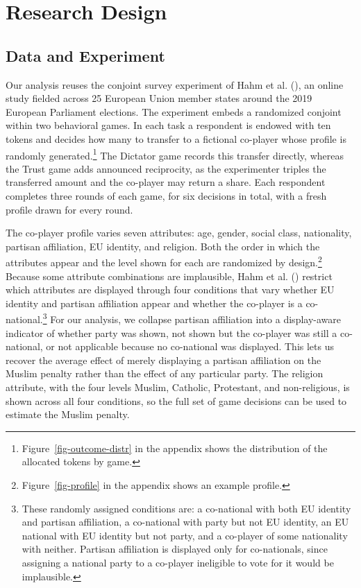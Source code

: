 \documentclass[
  10pt,
  a4paper,
  DIV=11,
  numbers=noendperiod]{scrartcl}
\begin{document}
\section{Research Design}\label{sec-design}

\subsection{Data and Experiment}\label{data-and-experiment}

Our analysis reuses the conjoint survey experiment of Hahm et al.
(), an online study fielded across
25 European Union member states around the 2019 European Parliament
elections. The experiment embeds a randomized conjoint within two
behavioral games. In each task a respondent is endowed with ten tokens
and decides how many to transfer to a fictional co-player whose profile
is randomly generated.\footnote{Figure~\ref{fig-outcome-distr} in the
  appendix shows the distribution of the allocated tokens by game.} The
Dictator game records this transfer directly, whereas the Trust game
adds announced reciprocity, as the experimenter triples the transferred
amount and the co-player may return a share. Each respondent completes
three rounds of each game, for six decisions in total, with a fresh
profile drawn for every round.

The co-player profile varies seven attributes: age, gender, social
class, nationality, partisan affiliation, EU identity, and religion.
Both the order in which the attributes appear and the level shown for
each are randomized by design.\footnote{Figure~\ref{fig-profile} in the
  appendix shows an example profile.} Because some attribute
combinations are implausible, Hahm et al.
() restrict which attributes are
displayed through four conditions that vary whether EU identity and
partisan affiliation appear and whether the co-player is a
co-national.\footnote{These randomly assigned conditions are: a
  co-national with both EU identity and partisan affiliation, a
  co-national with party but not EU identity, an EU national with EU
  identity but not party, and a co-player of some nationality with
  neither. Partisan affiliation is displayed only for co-nationals,
  since assigning a national party to a co-player ineligible to vote for
  it would be implausible.} For our analysis, we collapse partisan
affiliation into a display-aware indicator of whether party was shown,
not shown but the co-player was still a co-national, or not applicable
because no co-national was displayed. This lets us recover the average
effect of merely displaying a partisan affiliation on the Muslim penalty
rather than the effect of any particular party. The religion attribute,
with the four levels Muslim, Catholic, Protestant, and non-religious, is
shown across all four conditions, so the full set of game decisions can
be used to estimate the Muslim penalty.
\end{document}
